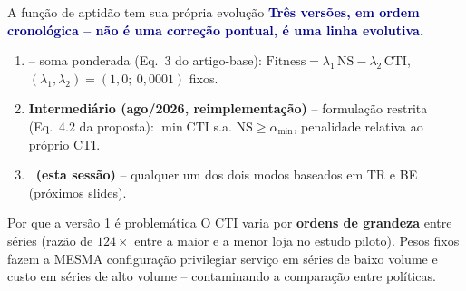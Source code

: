 \begin{frame}{A função de aptidão tem sua própria evolução}
  \textbf{\textcolor{darkblue}{Três versões, em ordem cronológica -- não é uma correção pontual, é uma linha evolutiva.}}
  \vspace{0.5em}

  \begin{enumerate}
    \item \textbf{\antes} -- soma ponderada (Eq.~3 do artigo-base):
      $\mathrm{Fitness}=\lambda_1\,\mathrm{NS}-\lambda_2\,\mathrm{CTI}$,
      $(\lambda_1,\lambda_2)=(1{,}0;\ 0{,}0001)$ fixos.
    \item \textbf{Intermediário (ago/2026, reimplementação)} -- formulação
      restrita (Eq.~4.2 da proposta): $\min \mathrm{CTI}$ s.a.
      $\mathrm{NS}\geq\alpha_{\min}$, penalidade relativa ao próprio CTI.
    \item \textbf{\novo\ (esta sessão)} -- qualquer um dos dois modos
       baseados em TR e BE (próximos slides).
  \end{enumerate}
  \vspace{0.6em}

  \begin{alertblock}{Por que a versão 1 é problemática}
    \small O CTI varia por \textbf{ordens de grandeza} entre séries (razão
    de $124\times$ entre a maior e a menor loja no estudo piloto). Pesos
    fixos fazem a MESMA configuração privilegiar serviço em séries de
    baixo volume e custo em séries de alto volume -- contaminando a
    comparação entre políticas.
  \end{alertblock}

\end{frame}
